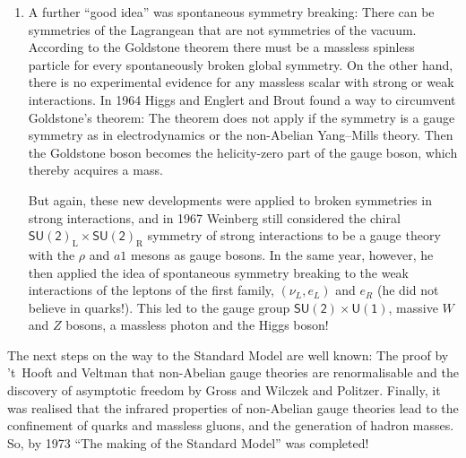 \documentclass[12pt]{report}
\newcommand{\2}{\ensuremath{\sqrt{2}\,}}
\begin{document}
{\begin{enumerate}
           But all physical applications of non-Abelian gauge theories seemed to require massive
           vector bosons because no massless ones had been found, neither in strong nor weak 
           interactions. Such mass terms had to be inserted by hand, breaking explicitly the 
           local gauge symmetry and thereby destroying the rationale for introducing non-Abelian
           local symmetries in the first place. Furthermore, it was realized that non-Abelian gauge
           theories with mass terms would be non-renormalisable, plagued by the same divergencies as
           the four-fermion theory of weak interactions.


        \item A further ``good idea'' was spontaneous symmetry breaking: There can be symmetries of
           the Lagrangean that are not symmetries of the vacuum.  According to the Goldstone
           theorem there must be a massless spinless particle for every spontaneously broken global 
           symmetry. On the other hand, there is no experimental evidence for any massless scalar 
           with strong or weak interactions. In 1964 Higgs and Englert and Brout found a way to
           circumvent Goldstone's theorem: The theorem does not apply if the symmetry is a gauge
           symmetry as in electrodynamics or the non-Abelian Yang--Mills theory. Then the Goldstone
           boson becomes the helicity-zero part of the gauge boson, which thereby acquires a mass.   

           But again, these new developments were applied to broken symmetries in strong interactions,
           and in 1967 Weinberg still considered the chiral  
           $\mathsf{SU(2)}_\text{L}\times\mathsf{SU(2)}_\text{R}$ symmetry of strong interactions
           to be a gauge theory with the $\rho$ and $a1$ mesons as gauge bosons. In the same year,
           however, 
           he then applied the idea of spontaneous symmetry breaking to the weak interactions of
           the leptons of the first family, $(\nu_L, e_L)$ and $e_R$ (he did not believe in quarks!).
           This led to the gauge group $\mathsf{SU(2)}\times\mathsf{U(1)}$, massive $W$ and
           $Z$ bosons, a massless photon and the Higgs boson! 

      \end{enumerate}
           The next steps on the way to the Standard Model are well known: The proof by 't~Hooft
           and Veltman that non-Abelian gauge theories are renormalisable and  the discovery of
           asymptotic freedom by Gross and Wilczek and Politzer. Finally, it was realised that the
           infrared properties of non-Abelian gauge theories lead to the confinement of quarks and
           massless gluons, and the generation of hadron masses. So, by 1973 ``The making of the
           Standard Model'' was completed!

}
\end{document}
